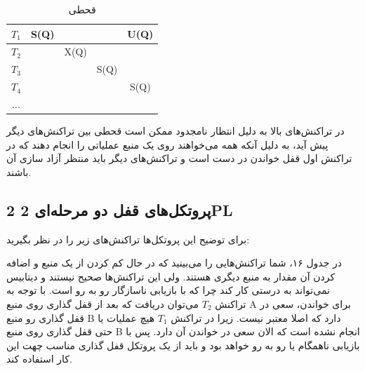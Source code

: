 \documentclass[a4paper]{article}
\begin{document}
\begin{LTR}
    \begin{table}[h]
        \begin{RTL}
            \caption{قحطی}
        \end{RTL}
        \centering
            \begin{tabular}{c|c|c|c|c}
                $T_{1}$ & S(Q) & & & U(Q) \\ \hline
                $T_{2}$ & & X(Q) & & \\ \hline
                $T_{3}$ & & & S(Q) & \\ \hline
                $T_{4}$ & & & & S(Q) \\ \hline
                $...$ & & & & \\ 
            \end{tabular}
    \end{table}
\end{LTR}

در تراکنش‌های بالا به دلیل انتظار نامجدود ممکن است قحطی بین تراکنش‌های دیگر پیش
آید، به دلیل آنکه همه می‌خواهند روی یک منبع عملیاتی را انجام دهند که در تراکنش
اول قفل خواندن در دست است و تراکنش‌های دیگر باید منتظر آزاد سازی آن باشند.

\newpage

\subsection{پروتکل‌های قفل دو مرحله‌ای 2 2PL}

برای توضیح این پروتکل‌ها تراکنش‌های زیر را در نظر بگیرید:

\begin{LTR}
    \begin{table}[h]
        \begin{RTL}
            \caption{زمانبندی $S_{5}$}
        \end{RTL}
        \centering
    \end{table}
\end{LTR}

در جدول ۱۶، شما تراکنش‌هایی را می‌بینید که در حال کم کردن از یک منبع و اضافه
کردن آن مقدار به منبع دیگری هستند. ولی این تراکنش‌ها صحیح نیستند و دیتابیس
نمی‌تواند به درستی کار کند چرا که با بازیابی ناسازگار رو به رو است. با توجه به
تراکنش $T_{2}$ می‌توان دریافت که بعد از قفل گذاری روی منبع A برای خواندن، سعی در
قفل گذاری رو منبع B دارد که اصلا معتبر نیست. زیرا در تراکنش $T_{1}$ هیچ عملیات
یا حتی قفل گذاری روی منبع B انجام نشده است که الان سعی در خواندن آن دارد. پس با
بازیابی ناهمگام یا  رو به رو خواهد بود و باید از یک
پروتکل قفل گذاری مناسب چهت این کار استفاده کند.
\end{document}
